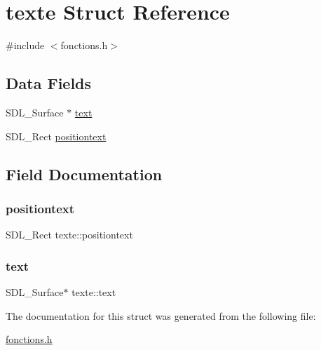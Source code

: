 \hypertarget{structtexte}{}\section{texte Struct Reference}
\label{structtexte}


{\ttfamily \#include $<$fonctions.\+h$>$}

\subsection*{Data Fields}
\begin{DoxyCompactItemize}
\item 
S\+D\+L\+\_\+\+Surface $\ast$ \hyperlink{structtexte_aa9035dd40a1043d6af3de77bb3c3acb3}{text}
\item 
S\+D\+L\+\_\+\+Rect \hyperlink{structtexte_abffbec7038436946441db9a70902e93a}{positiontext}
\end{DoxyCompactItemize}


\subsection{Field Documentation}
\mbox{\label{structtexte_abffbec7038436946441db9a70902e93a}} 
\subsubsection{\texorpdfstring{positiontext}{positiontext}}
{\footnotesize\ttfamily S\+D\+L\+\_\+\+Rect texte\+::positiontext}

\mbox{\label{structtexte_aa9035dd40a1043d6af3de77bb3c3acb3}} 
\subsubsection{\texorpdfstring{text}{text}}
{\footnotesize\ttfamily S\+D\+L\+\_\+\+Surface$\ast$ texte\+::text}



The documentation for this struct was generated from the following file\+:\begin{DoxyCompactItemize}
\item 
\hyperlink{fonctions_8h}{fonctions.\+h}\end{DoxyCompactItemize}
